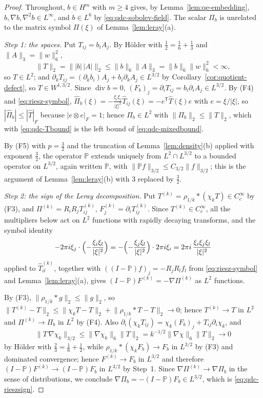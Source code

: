 \documentclass[11pt]{article}
\theoremstyle{definition}
\theoremstyle{plain}
\newcommand{\norm}[1]{\lVert #1\rVert}
\begin{document}
\begin{proof}
Throughout, $b\in H^m$ with $m\ge4$ gives, by Lemma~\ref{lem:qe-embedding},
$b,\nabla b,\nabla^2b\in L^\infty$, and $b\in L^6$ by
\eqref{eq:qdc-sobolev-field}.  The scalar $\Pi_b$ is unrelated to the matrix
symbol $\Pi(\xi)$ of Lemma~\ref{lem:leray}(a).

\emph{Step 1: the spaces.}  Put $T_{ij}=b_iA_j$.  By H\"older with
$\frac12=\frac16+\frac13$ and $\norm A_3=\norm w_6^2$,
\begin{equation}\label{eq:qdc-Tbound}
 \norm T_2=\bigl\||b|\,|A|\bigr\|_2\le\norm b_6\norm A_3=\norm b_6\norm w_6^2<\infty ,
\end{equation}
so $T\in L^2$; and $\partial_kT_{ij}=(\partial_kb_i)A_j+b_i\partial_kA_j\in L^{3/2}$
by Corollary~\ref{cor:quotient-defect}, so $T\in W^{1,3/2}$.  Since
$\operatorname{div}b=0$, $(F_b)_j=\partial_iT_{ij}=b_i\partial_iA_j\in L^{3/2}$.
By (F4) and \eqref{eq:riesz-symbol},
$\hat\Pi_b(\xi)=-\frac{\xi_i\xi_j}{|\xi|^2}\hat T_{ij}(\xi)
=-e^{\mathsf T}\hat T(\xi)e$ with $e=\xi/|\xi|$, so
$|\hat\Pi_b|\le|\hat T|_F$ because $|e\otimes e|_F=1$; hence
$\Pi_b\in L^2$ with $\norm{\Pi_b}_2\le\norm T_2$, which with
\eqref{eq:qdc-Tbound} is the left bound of \eqref{eq:qdc-mixedbound}.

By (F5) with $p=\frac32$ and the truncation of Lemma~\ref{lem:density}(b)
applied with exponent $\frac32$, the operator $\mathbb P$ extends uniquely
from $L^2\cap L^{3/2}$ to a bounded operator on $L^{3/2}$, again written
$\mathbb P$, with $\norm{\mathbb Pf}_{3/2}\le C_{3/2}\norm f_{3/2}$; this is
the argument of Lemma~\ref{lem:leray}(b) with $3$ replaced by $\frac32$.

\emph{Step 2: the sign of the Leray decomposition.}  Put
$T^{(k)}=\rho_{1/k}*(\chi_kT)\in C_c^\infty$ by (F3), and
$\Pi^{(k)}=R_iR_jT^{(k)}_{ij}$, $F^{(k)}_j=\partial_iT^{(k)}_{ij}$.  Since
$T^{(k)}\in C_c^\infty$, all the multipliers below act on $L^2$ functions
with rapidly decaying transforms, and the symbol identity
\[
 -2\pi i\xi_j\cdot\Bigl(-\frac{\xi_i\xi_l}{|\xi|^2}\Bigr)
 =-\Bigl(-\frac{\xi_j\xi_l}{|\xi|^2}\Bigr)\cdot2\pi i\xi_i
 =2\pi i\,\frac{\xi_i\xi_j\xi_l}{|\xi|^2}
\]
applied to $\hat T^{(k)}_{il}$, together with
$((I-\mathbb P)f)_j=-R_jR_lf_l$ from \eqref{eq:riesz-symbol} and
Lemma~\ref{lem:leray}(a), gives
$(I-\mathbb P)F^{(k)}=-\nabla\Pi^{(k)}$ as $L^2$ functions.

By (F3), $\norm{\rho_{1/k}*g}_2\le\norm g_2$, so
$\norm{T^{(k)}-T}_2\le\norm{\chi_kT-T}_2+\norm{\rho_{1/k}*T-T}_2\to0$;
hence $T^{(k)}\to T$ in $L^2$ and $\Pi^{(k)}\to\Pi_b$ in $L^2$ by (F4).  Also
$\partial_i(\chi_kT_{ij})=\chi_k(F_b)_j+T_{ij}\partial_i\chi_k$, and
\[
 \norm{T\,\nabla\chi_k}_{3/2}\le\norm{\nabla\chi_k}_6\norm T_2
 =k^{-1/2}\norm{\nabla\chi}_6\norm T_2\longrightarrow0
\]
by H\"older with $\frac23=\frac16+\frac12$, while
$\rho_{1/k}*(\chi_kF_b)\to F_b$ in $L^{3/2}$ by (F3) and dominated
convergence; hence $F^{(k)}\to F_b$ in $L^{3/2}$ and therefore
$(I-\mathbb P)F^{(k)}\to(I-\mathbb P)F_b$ in $L^{3/2}$ by Step~1.  Since
$\nabla\Pi^{(k)}\to\nabla\Pi_b$ in the sense of distributions, we conclude
$\nabla\Pi_b=-(I-\mathbb P)F_b\in L^{3/2}$, which is
\eqref{eq:qdc-rieszsign}.


\end{proof}
\end{document}
